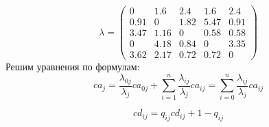\begin{equation*}
\lambda =
 \begin{pmatrix}
  0  &  1.6   & 2.4   & 1.6    &2.4 \\
  0.91&    0   & 1.82  &  5.47  &  0.91 \\
  3.47 &   1.16 &   0   & 0.58   & 0.58  \\
  0    &4.18    &0.84    &0       &3.35 \\
  3.62  &  2.17  &  0.72  &  0.72  &  0
 \end{pmatrix}
\end{equation*}
Решим уравнения по формулам:
\begin{equation*}
ca_j=\frac{\lambda_{0j}}{\lambda_j}ca_{0j}+\sum_{i=1}^{n}\frac{\lambda_{ij}}{\lambda_j}ca_{ij}=\sum_{i=0}^{n}\frac{\lambda_{ij}}{\lambda_j}ca_{ij}
\end{equation*}

\begin{equation*}
cd_{ij}=q_{ij}cd_{ij}+1-q_{ij}
\end{equation*}

